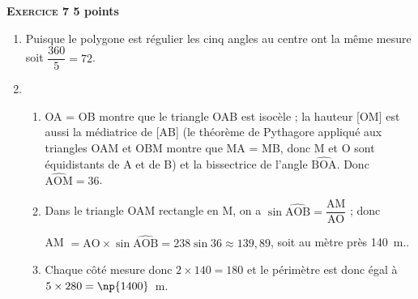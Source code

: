 \textbf{\textsc{Exercice 7} \hfill 5 points}

\medskip 

% 
% 

\medskip

\begin{enumerate}
\item %
Puisque le polygone est régulier les cinq angles au centre ont la même mesure soit $\dfrac{360}{5} = 72$\degres. 
\item %
	\begin{enumerate}
		\item %
OA = OB montre que le triangle OAB est isocèle  ; la hauteur [OM] est aussi la médiatrice de [AB] (le théorème de Pythagore appliqué aux triangles OAM et OBM montre que MA = MB, donc M et O sont équidistants de A et de B) et la bissectrice de l'angle $\widehat{\text{BOA}}$. 
Donc $\widehat{\text{AOM}} = 36$\degres.
		\item %
		Dans le triangle OAM rectangle en M, on a $\sin \widehat{\text{AOB}} = \dfrac{\text{AM}}{\text{AO}}$ ; donc 
		
AM $ =  {\text{AO}} \times \sin \widehat{\text{AOB}} = 238 \sin 36 \approx 139,89$, soit au mètre près 140~m..
		\item %
		Chaque côté mesure donc $2 \times 140 = 180$ et le périmètre est donc égal à $5 \times 280 = \np{1400}$~m.
	\end{enumerate}
\end{enumerate}
 
\bigskip

